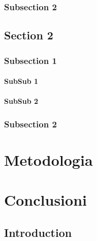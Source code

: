 \documentclass[11pt,b5paper,openany,titlepage,twoside]{book}
\begin{document}
	\subsection{Subsection 2}

	\section{Section 2}
	\subsection{Subsection 1}
	\subsubsection{SubSub 1}
	\subsubsection{SubSub 2}
	\subsection{Subsection 2}
	
	\chapter{Metodologia}
	
	\chapter{Conclusioni}

\section{Introduction}
\end{document}
